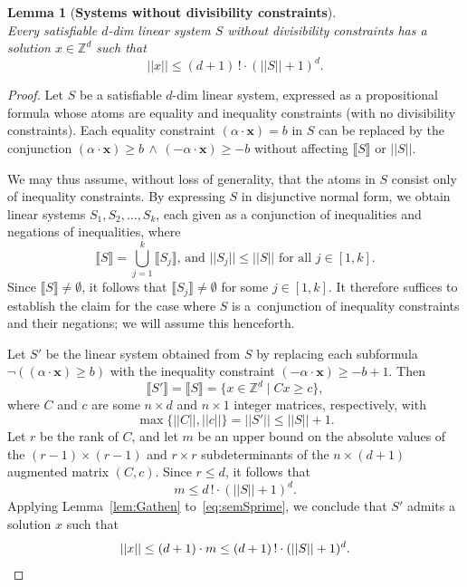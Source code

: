 \documentclass[11pt,a4paper]{amsart}
\newcommand{\bvar}[1]{\mathbf{#1}}
\newcommand{\nnorm}[1]{||#1||}
\newcommand{\Zset}{\mathbb{Z}}
\newcommand{\setZ}{\Zset}
\newcommand{\scalar}[2]{(#1 \cdot #2)}
\newcommand{\sem}[1]{\llbracket#1\rrbracket}
\theoremstyle{plain}
\newtheorem{lem}[thm]{Lemma}
\theoremstyle{definition}
\theoremstyle{defC}
\theoremstyle{thmC}
\begin{document}
\begin{lem}[\textbf{Systems without divisibility constraints}]
\label{lem:nodivsmallsolutions}
\hfill\\
Every satisfiable $d$-dim linear system $S$ without divisibility constraints has a solution $x \in \mathbb{Z}^d$ such that 
\[
    \nnorm{x} \leq (d+1)\,!\cdot(\nnorm{S}+1)^d.
\]
\end{lem}
\begin{proof}
Let $S$ be a satisfiable $d$-dim linear system, expressed as a
	propositional formula whose atoms are equality and inequality
	constraints (with no divisibility constraints).
Each equality constraint
	$\scalar{\alpha}{\bvar{x}}=b$ in $S$ can be replaced by the
	conjunction
	$\scalar{\alpha}{\bvar{x}}\geq b\,\wedge\,
	\scalar{-\alpha}{\bvar{x}}\geq -b$ without affecting
	$\sem{S}$ or $\nnorm{S}$. 

	We may thus assume,
	without loss of generality, that the atoms in $S$ consist only
	of inequality constraints.
By
expressing $S$ in disjunctive normal form, we obtain
	linear systems $S_1,S_2,\ldots,S_k$, each given as a
	conjunction of inequalities and negations of
	inequalities, where
	\[\sem{S}=\bigcup_{j=1}^k\sem{S_j}\text{, and }
	\nnorm{S_j}\leq \nnorm{S}\text{ for all }j\in[1,k].\]
Since $\sem{S}\neq\emptyset$, it follows that $\sem{S_j}\neq\emptyset$ for some $j\in[1,k]$.
It therefore suffices to establish the claim for the case where  
$S$ is a~conjunction of inequality constraints and their negations; we
	will assume this henceforth.

Let $S'$ be the linear system obtained from $S$ by replacing
	each subformula $\neg(\scalar{\alpha}{\bvar{x}}\geq b)$ with
	the
	inequality constraint $\scalar{-\alpha}{\bvar{x}}\geq -b+1$.
Then
	\begin{equation}\label{eq:semSprime}\sem{S'}=\sem{S}=\{x\in\setZ^d\mid
	Cx\geq c\},\end{equation}
where $C$ and $c$ are some $n\times d$ and $n\times 1$ integer
	matrices, respectively, with
	\[
		\max\{\nnorm{C},\nnorm{c}\}=\nnorm{S'}\leq\nnorm{S}+1.\]
        Let $r$ be the rank of $C$, and let $m$ be an upper bound on
	the absolute values of the $(r-1)\times (r-1)$ and $r\times r$
	subdeterminants of the $n\times (d+1)$ augmented matrix $(C, c)$.
Since  $r\leq d$, it follows that
	\[m\leq d\,!\cdot (\nnorm{S}+1)^d.\]
	Applying Lemma~\ref{lem:Gathen} to~\eqref{eq:semSprime}, we
conclude that $S'$ admits a solution $x$ such that 
	\[\nnorm{x}\leq (d+1)\cdot m\leq (d+1)\,!\cdot
	(\nnorm{S}+1)^d.\qedhere\]
\end{proof}
\end{document}
